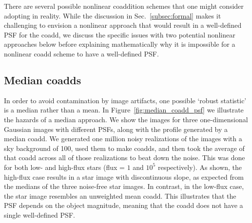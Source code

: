 \documentclass{aastex63}
\begin{document}
There are several possible nonlinear coaddition schemes that one might consider adopting in reality.  While the discussion in Sec.~\ref{subsec:formal} makes it challenging to envision a nonlinear approach that would result in a well-defined PSF for the coadd, we discuss the specific issues with two potential nonlinear approaches below before explaining mathematically why it is impossible for a nonlinear coadd scheme to have a well-defined PSF.

\subsection{Median coadds}

In order to avoid contamination by image artifacts, one possible `robust statistic' is a median rather than a mean.  In Figure~\ref{fig:median_coadd_psf} we illustrate the hazards of a median approach.
We show the images for three one-dimensional Gaussian images with different PSFs, along with the profile generated by a median coadd.  We generated one million noisy realizations of the images with a sky background of 100,  used them to make coadds, and then took the average of that coadd across all of those realizations to beat down the noise.  This was done for both low- and high-flux stars (flux = $1$ and $10^5$ respectively).
As shown, the high-flux case results in a star image with discontinuous slope, as expected from the medians of the three noise-free star images.  In contrast, in the low-flux case, the star image resembles an unweighted mean coadd. 
This illustrates that the PSF depends on the object magnitude, meaning that the coadd does not have a single well-defined PSF.
\end{document}
